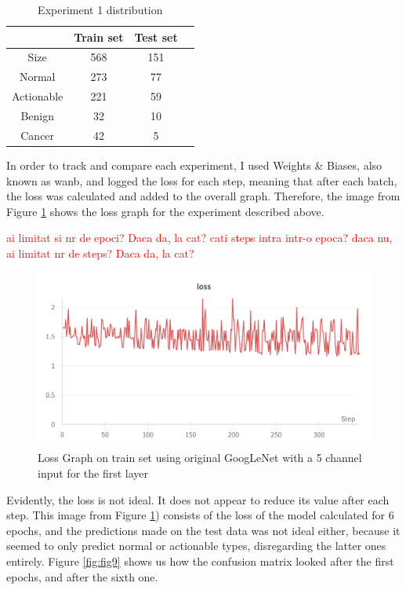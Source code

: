 \begin{table}[ht!]
\centering
\begin{tabular}{|c|c|c|c|}
    \hline
     & Train set & Test set \\ \hline
    Size & 568 & 151 \\ \hline
    Normal & 273 & 77\\ \hline
    Actionable & 221 & 59\\ \hline
    Benign & 32 & 10\\ \hline
    Cancer & 42 & 5\\ \hline
    \end{tabular}
    \caption{Experiment 1 distribution}
    \label{tab:tab1}
\end{table}

In order to track and compare each experiment, I used Weights \& Biases, also known as wanb, and logged the loss for each step, meaning that after each batch, the loss was calculated and added to the overall graph. Therefore, the image from Figure \ref{fig:fig8} shows the loss graph for the experiment described above.

\textcolor{red}{ai limitat si nr de epoci? Daca da, la cat? cati steps intra intr-o epoca? daca nu, ai limitat nr de steps? Daca da, la cat?}

\begin{figure}[!ht]
    \centering
    \includegraphics[width=1\textwidth]{figures/Figure8.png}
    \caption{Loss Graph on train set using original GoogLeNet with a 5 channel input for the first layer}
    \label{fig:fig8}
\end{figure}

Evidently, the loss is not ideal. It does not appear to reduce its value after each step. This image from Figure \ref{fig:fig8}) consists of the loss of the model calculated for 6 epochs, and the predictions made on the test data was not ideal either, because it seemed to only predict normal or actionable types, disregarding the latter ones entirely. Figure \ref{fig:fig9} shows us how the confusion matrix looked after the first epochs, and after the sixth one.

